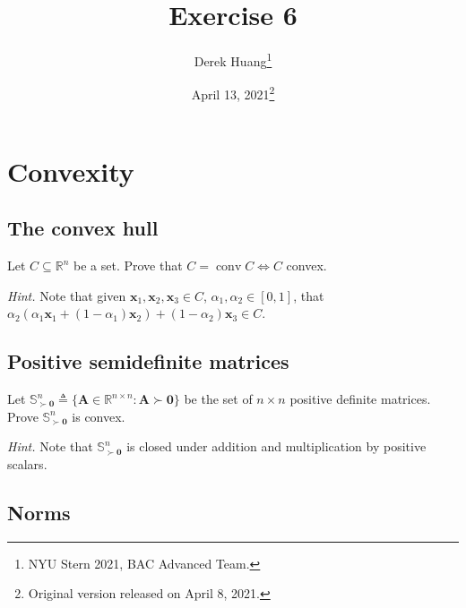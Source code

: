 \documentclass{article}
\title{Exercise 6}
\author{Derek Huang\thanks{NYU Stern 2021, BAC Advanced Team.}}
\date{April 13, 2021\thanks{Original version released on April 8, 2021.}}
\numberwithin{equation}{section}
\begin{document}
\maketitle
\thispagestyle{fancy}


\section{Convexity}

\subsection{The convex hull}

Let $ C \subseteq \mathbb{R}^n $ be a set. Prove that $ C =
\operatorname{conv} C \Leftrightarrow C $ convex.

\medskip

\textit{Hint.} Note that given $ \mathbf{x}_1, \mathbf{x}_2, \mathbf{x}_3
\in C $, $ \alpha_1, \alpha_2 \in [0, 1] $, that
$ \alpha_2(\alpha_1\mathbf{x}_1 + (1 - \alpha_1)\mathbf{x}_2) +
(1 - \alpha_2)\mathbf{x}_3 \in C $.

\subsection{Positive semidefinite matrices}

Let $ \mathbb{S}_{\succ\mathbf{0}}^n \triangleq \{\mathbf{A} \in
\mathbb{R}^{n \times n} : \mathbf{A} \succ \mathbf{0}\} $ be the set of
$ n \times n $ positive definite matrices. Prove
$ \mathbb{S}_{\succ\mathbf{0}}^n $ is convex.

\medskip

\textit{Hint.} Note that $ \mathbb{S}_{\succ\mathbf{0}}^n $ is closed under
addition and multiplication by positive scalars.

\subsection{Norms}
\end{document}
